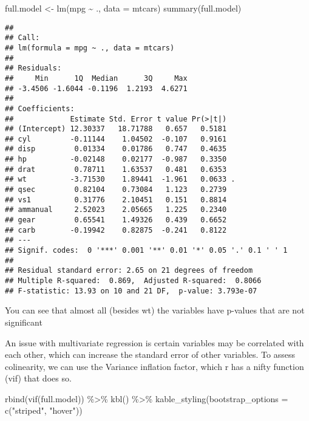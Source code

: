 \documentclass[
]{article}
\newenvironment{Shaded}{\begin{snugshade}}{\end{snugshade}}
\newcommand{\AttributeTok}[1]{\textcolor[rgb]{0.77,0.63,0.00}{#1}}
\newcommand{\FunctionTok}[1]{\textcolor[rgb]{0.00,0.00,0.00}{#1}}
\newcommand{\NormalTok}[1]{#1}
\newcommand{\OtherTok}[1]{\textcolor[rgb]{0.56,0.35,0.01}{#1}}
\newcommand{\SpecialCharTok}[1]{\textcolor[rgb]{0.00,0.00,0.00}{#1}}
\newcommand{\StringTok}[1]{\textcolor[rgb]{0.31,0.60,0.02}{#1}}
\begin{document}
\begin{Shaded}
\begin{Highlighting}[]
\NormalTok{full.model }\OtherTok{\textless{}{-}} \FunctionTok{lm}\NormalTok{(mpg }\SpecialCharTok{\textasciitilde{}}\NormalTok{ ., }\AttributeTok{data =}\NormalTok{ mtcars)}
\FunctionTok{summary}\NormalTok{(full.model) }
\end{Highlighting}
\end{Shaded}

\begin{verbatim}
## 
## Call:
## lm(formula = mpg ~ ., data = mtcars)
## 
## Residuals:
##     Min      1Q  Median      3Q     Max 
## -3.4506 -1.6044 -0.1196  1.2193  4.6271 
## 
## Coefficients:
##             Estimate Std. Error t value Pr(>|t|)  
## (Intercept) 12.30337   18.71788   0.657   0.5181  
## cyl         -0.11144    1.04502  -0.107   0.9161  
## disp         0.01334    0.01786   0.747   0.4635  
## hp          -0.02148    0.02177  -0.987   0.3350  
## drat         0.78711    1.63537   0.481   0.6353  
## wt          -3.71530    1.89441  -1.961   0.0633 .
## qsec         0.82104    0.73084   1.123   0.2739  
## vs1          0.31776    2.10451   0.151   0.8814  
## ammanual     2.52023    2.05665   1.225   0.2340  
## gear         0.65541    1.49326   0.439   0.6652  
## carb        -0.19942    0.82875  -0.241   0.8122  
## ---
## Signif. codes:  0 '***' 0.001 '**' 0.01 '*' 0.05 '.' 0.1 ' ' 1
## 
## Residual standard error: 2.65 on 21 degrees of freedom
## Multiple R-squared:  0.869,  Adjusted R-squared:  0.8066 
## F-statistic: 13.93 on 10 and 21 DF,  p-value: 3.793e-07
\end{verbatim}

You can see that almost all (besides wt) the variables have p-values
that are not significant

An issue with multivariate regression is certain variables may be
correlated with each other, which can increase the standard error of
other variables. To assess colinearity, we can use the Variance
inflation factor, which r has a nifty function (vif) that does so.

\begin{Shaded}
\begin{Highlighting}[]
\FunctionTok{rbind}\NormalTok{(}\FunctionTok{vif}\NormalTok{(full.model))  }\SpecialCharTok{\%\textgreater{}\%}
  \FunctionTok{kbl}\NormalTok{() }\SpecialCharTok{\%\textgreater{}\%}
  \FunctionTok{kable\_styling}\NormalTok{(}\AttributeTok{bootstrap\_options =} \FunctionTok{c}\NormalTok{(}\StringTok{"striped"}\NormalTok{, }\StringTok{"hover"}\NormalTok{))}
\end{Highlighting}
\end{Shaded}
\end{document}

